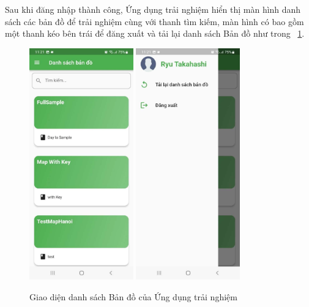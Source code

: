 \newpage
Sau khi đăng nhập thành công, Ứng dụng trải nghiệm hiển thị màn hình danh
sách các bản đồ để trải nghiệm cùng với thanh tìm kiếm, màn hình có bao gồm một
thanh kéo bên trái để đăng xuất và tải lại danh sách Bản đồ như trong \figurename~\ref{fig:player-map-list}.
\begin{figure}
    \centering
    \includegraphics[width=0.4\textwidth]{figures/player-map-list-1.jpg}
    \includegraphics[width=0.4\textwidth]{figures/player-map-list-2.jpg}
    \caption{Giao diện danh sách Bản đồ của Ứng dụng trải nghiệm}
    \label{fig:player-map-list}
\end{figure}

